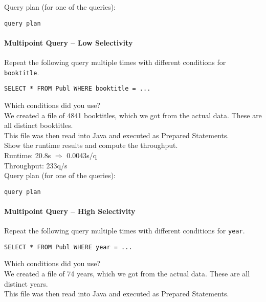 \documentclass[11pt]{scrartcl}
\begin{document}
\smallskip\noindent
Query plan (for one of the queries):
{\small
\begin{verbatim}
query plan
\end{verbatim}
}

\paragraph{Multipoint Query -- Low Selectivity}

Repeat the following query multiple times with different conditions for {\tt booktitle}.

{\small
\begin{verbatim}
SELECT * FROM Publ WHERE booktitle = ...
\end{verbatim}
}

\noindent
Which conditions did you use?\\
We created a file of 4841 booktitles, which we got from the actual data. These are all distinct booktitles.\\
This file was then read into Java and executed as Prepared Statements.\\

\smallskip\noindent
Show the runtime results and compute the throughput.\\
Runtime: 20.8s $\Rightarrow$ 0.0043s/q\\
Throughput: 233q/s\\

\smallskip\noindent
Query plan (for one of the queries):
{\small
\begin{verbatim}
query plan
\end{verbatim}
}


\paragraph{Multipoint Query -- High Selectivity}

Repeat the following query multiple times with different conditions for {\tt year}.

{\small
\begin{verbatim}
SELECT * FROM Publ WHERE year = ...
\end{verbatim}
}

\noindent
Which conditions did you use?\\
We created a file of 74 years, which we got from the actual data. These are all distinct years.\\
This file was then read into Java and executed as Prepared Statements.\\
\end{document}
